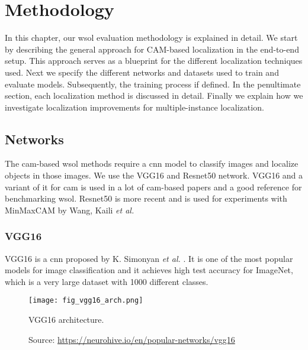 \chapter{Methodology} \label{ch:methodology}

In this chapter, our \acrshort{wsol} evaluation methodology is explained in detail. We start by describing the general approach for CAM-based localization in the end-to-end setup. This approach serves as a blueprint for the different localization techniques used. Next we specify the different networks and datasets used to train and evaluate models. Subsequently, the training process if defined. In the penultimate section, each localization method is discussed in detail. Finally we explain how we investigate localization improvements for multiple-instance localization.

\section{Networks}
The \acrshort{cam}-based \acrshort{wsol} methods require a \acrshort{cnn} model to classify images and localize objects in those images. We use the VGG16 and Resnet50 network. VGG16 and a variant of it for \acrshort{cam} is used in a lot of \acrshort{cam}-based papers and a good reference for benchmarking \acrshort{wsol}. Resnet50 is more recent and is used for experiments with MinMaxCAM by Wang, Kaili \textit{et al.}

\subsection{VGG16}
VGG16 is a \acrshort{cnn} proposed by K. Simonyan \textit{et al.} \cite{simonyan2014very}. It is one of the most popular models for image classification and it achieves high test accuracy for ImageNet, which is a very large dataset with 1000 different classes.
\begin{figure}[ht]
    \begin{center}       
    \texttt{[image: fig\_vgg16\_arch.png]}
    \caption[VGG16 architecture]{VGG16 architecture.}
    \caption*{Source: \href{https://neurohive.io/en/popular-networks/vgg16}{https://neurohive.io/en/popular-networks/vgg16}}
    \label{fig:vgg16_arch}
    \end{center}
\end{figure}

